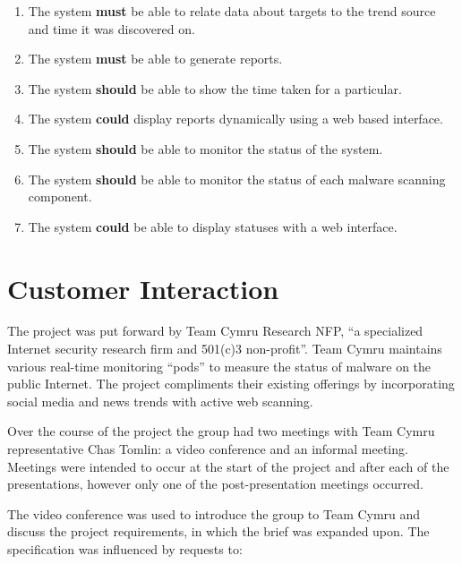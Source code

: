 \begin{enumerate}
    \item The system \textbf{must} be able to relate data about targets to the
    trend source and time it was discovered on.
    \item The system \textbf{must} be able to generate reports.
    \item The system \textbf{should} be able to show the time taken for a particular.
    \item The system \textbf{could} display reports dynamically using a web based interface.
    \item The system \textbf{should} be able to monitor the status of the system.
    \item The system \textbf{should} be able to monitor the status of each malware scanning component.
    \item The system \textbf{could} be able to display statuses with a web interface.
\end{enumerate}

\section{Customer Interaction} The project was put forward by Team Cymru
Research NFP, ``a specialized Internet security research firm and 501(c)3
non-profit''\cite{team-cymru}. Team Cymru maintains various real-time monitoring
``pods'' to measure the status of malware on the public Internet. The project
compliments their existing offerings by incorporating social media and news
trends with active web scanning.

Over the course of the project the group had two meetings with Team Cymru
representative Chas Tomlin: a video conference and an informal meeting.
Meetings were intended to occur at the start of the project and after each of
the presentations, however only one of the post-presentation meetings occurred.

The video conference was used to introduce the group to Team Cymru and discuss
the project requirements, in which the brief was expanded upon. The
specification was influenced by requests to: 

